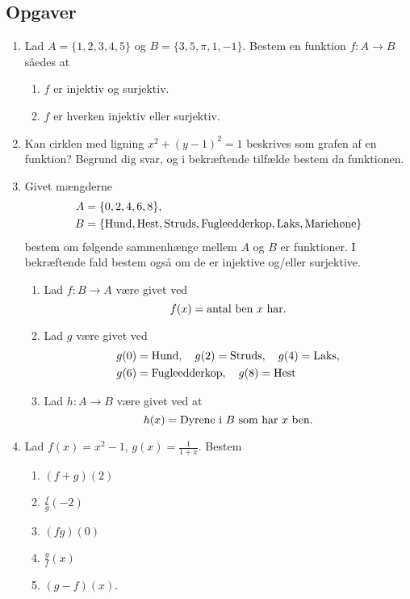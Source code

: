 \subsection{Opgaver}

\begin{enumerate}
	\item  Lad $A=\{1,2,3,4,5\}$ og $ B=\{ 3,5,\pi , 1,-1 \} $. Bestem en funktion $f\colon A\to B$ såedes at
	\begin{enumerate}
		\item $ f $ er injektiv og surjektiv.
		\item $f$ er hverken injektiv eller surjektiv.
	\end{enumerate}
	
	
	\item Kan cirklen med ligning $x^{2} +(y-1)^{2}=1$ beskrives som grafen af en funktion? Begrund dig svar, og i bekræftende tilfælde bestem da funktionen.
	
	\item Givet mængderne 
	\begin{align*}
	A&= \{0,2,4,6,8\},\\
	B&=\{\text{Hund},\textup{Hest},\textup{Struds},\textup{Fugleedderkop},\textup{Laks},\textup{Mariehøne} \}
	\end{align*}
	bestem om følgende sammenhænge mellem $A$ og $B$ er funktioner. I bekræftende fald bestem også om de er injektive og/eller surjektive.
	\begin{enumerate}
		\item Lad $f\colon B\to A$ være givet ved
		\[f(x)=\textup{antal ben }x \textup{ har}.\]
		\item Lad $g$ være givet ved
		\begin{align*}
		g(0)&=\textup{Hund},\quad g(2)=\textup{Struds},\quad g(4)=\textup{Laks},\\ g(6)&=\textup{Fugleedderkop},\quad g(8)=\textup{Hest}
		\end{align*}
		
		\item Lad $ h\colon A\to B$ være givet ved at 
		\[h(x)= \textup{Dyrene i }B \textup{ som har } x \textup{ ben}.\] 
	\end{enumerate}

	\item Lad $f(x)=x^2-1$, $g(x)=\frac{1}{1+x}$. Bestem
	\begin{enumerate}
		\item $(f+g)(2)$
		\item $ \frac{f}{g}(-2) $
		\item $(fg)(0)$
		\item $\frac{g}{f}(x)$
		\item $(g-f)(x)$.
	\end{enumerate}


\end{enumerate}
